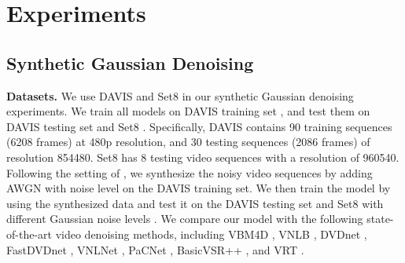 \documentclass[10pt,twocolumn,letterpaper]{article}
\newlength \g
\begin{document}

\newpage
\section{Experiments}











\subsection{Synthetic Gaussian Denoising}
\noindent\textbf{Datasets.}
We use DAVIS \cite{khoreva2018davis} and Set8 \cite{tassano2019dvdnet} in our synthetic Gaussian denoising experiments. 
We train all models on DAVIS training set \cite{khoreva2018davis}, and test them on DAVIS testing set and Set8 \cite{tassano2019dvdnet}.
Specifically, DAVIS \cite{khoreva2018davis} contains 90 training sequences (6208 frames) at 480p resolution, and 30 testing sequences (2086 frames) of resolution 854480.
Set8 \cite{tassano2019dvdnet} has 8 testing video sequences with a resolution of 960540.
Following the setting of \cite{liang2022vrt}, we synthesize the noisy video sequences by adding AWGN with noise level  on the DAVIS \cite{khoreva2018davis} training set.
We then train the model by using the synthesized data and test it on the DAVIS testing set and Set8 \cite{tassano2019dvdnet} with different Gaussian noise levels .
We compare our model with the following state-of-the-art video denoising methods, including VBM4D \cite{maggioni2012bm4d}, VNLB \cite{arias2018vnlb}, DVDnet \cite{tassano2019dvdnet}, FastDVDnet \cite{tassano2020fastdvdnet}, VNLNet \cite{davy2018vnlnet}, PaCNet \cite{vaksman2021pacnet}, BasicVSR++ \cite{chan2022basicvsrpp2}, and VRT \cite{liang2022vrt}.
\end{document}
